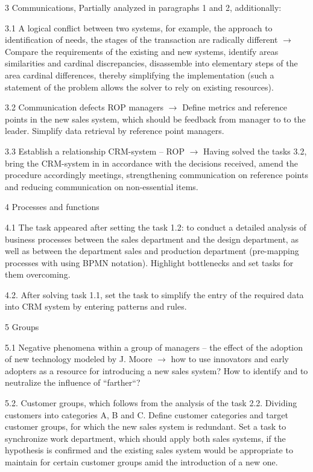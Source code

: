 \documentclass[11pt,a4paper]{book}
\begin{document}
3 Communications, Partially analyzed in paragraphs 1 and 2, additionally:

3.1 A logical conflict between two systems, for example, the approach to
identification of needs, the stages of the transaction are radically different
$\to$ Compare the requirements of the existing and new systems, identify areas
similarities and cardinal discrepancies, disassemble into elementary steps of
the area cardinal differences, thereby simplifying the implementation (such a
statement of the problem allows the solver to rely on existing resources).

3.2 Communication defects ROP managers $\to$ Define metrics and reference
points in the new sales system, which should be feedback from manager to to
the leader. Simplify data retrieval by reference point managers.

3.3 Establish a relationship CRM-system -- ROP $\to$ Having solved the tasks
3.2, bring the CRM-system in in accordance with the decisions received, amend
the procedure accordingly meetings, strengthening communication on reference
points and reducing communication on non-essential items.

4 Processes and functions

4.1 The task appeared after setting the task 1.2: to conduct a detailed
analysis of business processes between the sales department and the design
department, as well as between the department sales and production department
(pre-mapping processes with using BPMN notation). Highlight bottlenecks and
set tasks for them overcoming.

4.2.  After solving task 1.1, set the task to simplify the entry of the
required data into CRM system by entering patterns and rules.

5 Groups

5.1 Negative phenomena within a group of managers -- the effect of the
adoption of new technology modeled by J. Moore $\to$ how to use innovators and
early adopters as a resource for introducing a new sales system? How to
identify and to neutralize the influence of “farther“?

5.2.  Customer groups, which follows from the analysis of the task 2.2.
Dividing customers into categories A, B and C. Define customer categories and
target customer groups, for which the new sales system is redundant. Set a
task to synchronize work department, which should apply both sales systems, if
the hypothesis is confirmed and the existing sales system would be appropriate
to maintain for certain customer groups amid the introduction of a new one.
\end{document}
